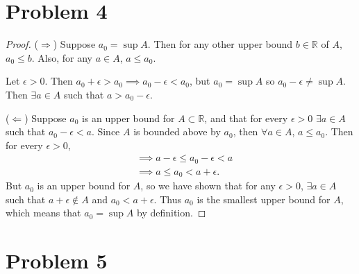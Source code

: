 \documentclass{article}
\begin{document}
\section*{Problem 4}
\begin{proof}
	($\Rightarrow$) Suppose $a_0 = \sup{A}$. Then for any other upper bound $b \in \mathbb{R}$ of $A$, $a_0 \leq b$. Also, for any $a\in A$, $a \leq a_0$.
	
	Let $\epsilon>0$. Then $a_0 + \epsilon > a_0 \implies a_0 - \epsilon < a_0$, but $a_0 = \sup{A}$ so $a_0 - \epsilon \neq \sup{A}$.  Then $\exists a \in A$ such that $a>a_0 - \epsilon$.
	
	($\Leftarrow$) Suppose $a_0$ is an upper bound for $A\subset\mathbb{R}$, and that for every $\epsilon > 0$ $\exists a\in A$ such that $a_0 - \epsilon < a$. Since $A$ is bounded above by $a_0$, then $\forall a \in A$, $a\leq a_0$. Then for every $\epsilon>0$,
	\begin{align}
		&\implies a-\epsilon \leq a_0 - \epsilon < a \\
		&\implies a \leq a_0 < a + \epsilon. 
	\end{align}
	But $a_0$ is an upper bound for $A$, so we have shown that for any $\epsilon>0$, $\exists a \in A$ such that $a+\epsilon \notin A$ and $a_0 < a + \epsilon$. Thus $a_0$ is the smallest upper bound for $A$, which means that $a_0=\sup{A}$ by definition.
\end{proof}

\section*{Problem 5}
\end{document}
